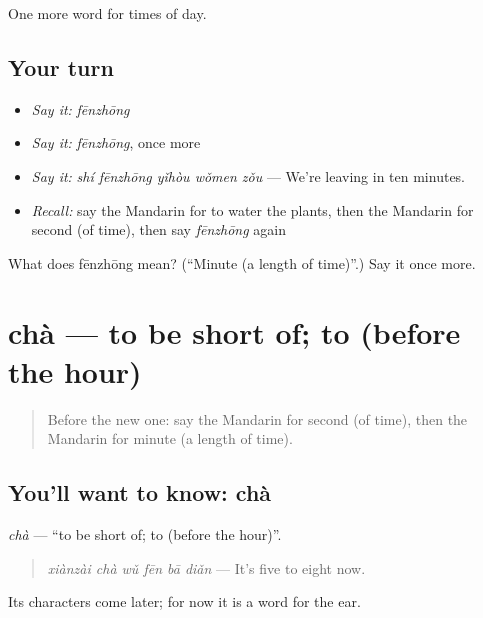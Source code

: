 \begin{grammarlens}[title={What you've built}]
One more word for times of day.
\end{grammarlens}

\subsection*{Your turn}
\begin{itemize}
\raggedright
  \item \emph{Say it:} \emph{fēnzhōng}
  \item \emph{Say it:} \emph{fēnzhōng}, once more
  \item \emph{Say it:} \emph{shí fēnzhōng yǐhòu wǒmen zǒu} — We're leaving in ten minutes.
  \item \emph{Recall:} say the Mandarin for to water the plants, then the Mandarin for second (of time), then say \emph{fēnzhōng} again
\end{itemize}

\begin{tcolorbox}[breakable,colback=teal!4,colframe=teal!35!black,title={Before you move on}]
What does fēnzhōng mean? (\textquotedblleft{}Minute (a length of time)\textquotedblright{}.) Say it once more.
\end{tcolorbox}
\section[chà]{chà — to be short of; to (before the hour)}

\label{lesson:ZH-C143-cha}



\begin{quote}
Before the new one: say the Mandarin for second (of time), then the Mandarin for minute (a length of time).
\end{quote}

\subsection*{You'll want to know: chà}
\emph{chà} — \textquotedblleft{}to be short of; to (before the hour)\textquotedblright{}.

\begin{quote}
\emph{xiànzài chà wǔ fēn bā diǎn} — It's five to eight now.
\end{quote}

Its characters come later; for now it is a word for the ear.

